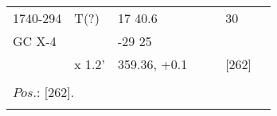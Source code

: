 \documentclass{aa}
\begin{document}
\begin{tabular}{p{2.5cm}p{1cm}p{1.8cm}p{2.3cm}p{3.3cm}p{2.0cm}p{2.2cm}}
\noalign{\smallskip}
1740-294         & T(?)        & 17 40.6                  &                    &                      & 30             &           \\
GC X-4             &                & -29 25                    &                    &                      &                   &               \\
                          & x 1.2'      & 359.36, +0.1         &                    &                      & [262]         &         \\
\\
\multicolumn{7}{p{17.5cm}}{
$Pos$.: [262].}\\
\noalign{\smallskip}
\hline

\end{tabular}
\end{document}
